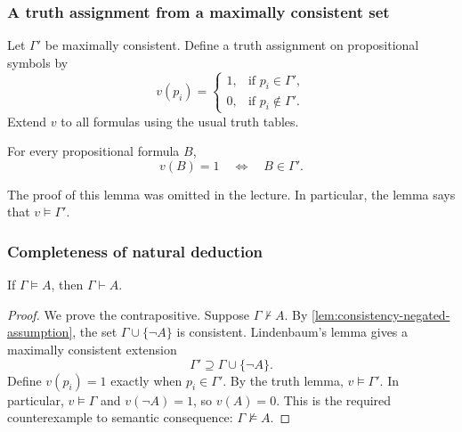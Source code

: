 \documentclass[11pt,a4paper]{amsart}
\begin{document}
\subsubsection{A truth assignment from a maximally consistent set}

Let \(\Gamma'\) be maximally consistent. Define a truth assignment on
propositional symbols by
\[
  v(p_i)=
  \begin{cases}
    1, & \text{if }p_i\in\Gamma',\\
    0, & \text{if }p_i\notin\Gamma'.
  \end{cases}
\]
Extend \(v\) to all formulas using the usual truth tables.

\begin{lemma}\label{lem:maximal-consistency-truth}
  For every propositional formula \(B\),
  \[
    v(B)=1\quad\Longleftrightarrow\quad B\in\Gamma'.
  \]
\end{lemma}

The proof of this lemma was omitted in the lecture. In particular, the
lemma says that \(v\models\Gamma'\).

\subsubsection{Completeness of natural deduction}

\begin{theorem}
  If \(\Gamma\models A\), then \(\Gamma\vdash A\).
\end{theorem}

\begin{proof}
  We prove the contrapositive. Suppose \(\Gamma\nvdash A\). By
  \cref{lem:consistency-negated-assumption}, the set
  \(\Gamma\cup\{\neg A\}\) is consistent. Lindenbaum's lemma gives
  a maximally consistent extension
  \[
    \Gamma'\supseteq\Gamma\cup\{\neg A\}.
  \]
  Define \(v(p_i)=1\) exactly when \(p_i\in\Gamma'\). By the truth
  lemma, \(v\models\Gamma'\). In particular, \(v\models\Gamma\) and
  \(v(\neg A)=1\), so \(v(A)=0\). This is the required counterexample
  to semantic consequence: \(\Gamma\not\models A\).
\end{proof}
\end{document}
